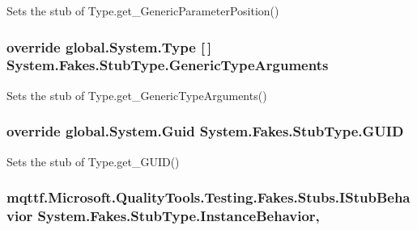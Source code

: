 Sets the stub of Type.\-get\-\_\-\-Generic\-Parameter\-Position()

\hypertarget{class_system_1_1_fakes_1_1_stub_type_ae50f6de6d8e96b7e11dee9c8a216ac10}{
\subsubsection[{Generic\-Type\-Arguments}]{\setlength{\rightskip}{0pt plus 5cm}override global.\-System.\-Type \mbox{[}$\,$\mbox{]} System.\-Fakes.\-Stub\-Type.\-Generic\-Type\-Arguments\hspace{0.3cm}{\ttfamily [get]}}}\label{class_system_1_1_fakes_1_1_stub_type_ae50f6de6d8e96b7e11dee9c8a216ac10}


Sets the stub of Type.\-get\-\_\-\-Generic\-Type\-Arguments()

\hypertarget{class_system_1_1_fakes_1_1_stub_type_ae304932f93a4d8b6dc741aa38a7a178a}{
\subsubsection[{G\-U\-I\-D}]{\setlength{\rightskip}{0pt plus 5cm}override global.\-System.\-Guid System.\-Fakes.\-Stub\-Type.\-G\-U\-I\-D\hspace{0.3cm}{\ttfamily [get]}}}\label{class_system_1_1_fakes_1_1_stub_type_ae304932f93a4d8b6dc741aa38a7a178a}


Sets the stub of Type.\-get\-\_\-\-G\-U\-I\-D()

\hypertarget{class_system_1_1_fakes_1_1_stub_type_a1d4eb003867e6bc396b0b54e806c88ce}{
\subsubsection[{Instance\-Behavior}]{\setlength{\rightskip}{0pt plus 5cm}mqttf.\-Microsoft.\-Quality\-Tools.\-Testing.\-Fakes.\-Stubs.\-I\-Stub\-Behavior System.\-Fakes.\-Stub\-Type.\-Instance\-Behavior\hspace{0.3cm}{\ttfamily [get]}, {\ttfamily [set]}}}\label{class_system_1_1_fakes_1_1_stub_type_a1d4eb003867e6bc396b0b54e806c88ce}


